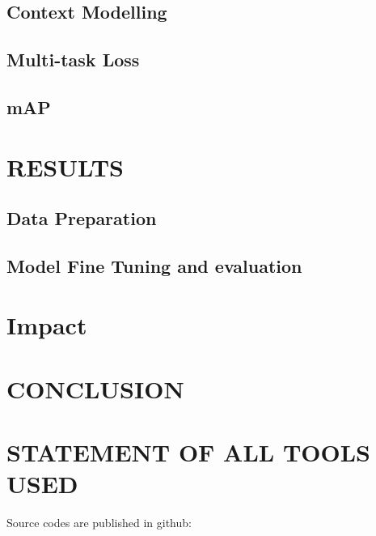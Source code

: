 \documentclass{article}
\begin{document}
\subsection{Context Modelling}

\subsection{Multi-task Loss}



\subsection{mAP}


\section{RESULTS}
\label{sec:results}

\subsection{Data Preparation}
\label{ssec:data}


  \subsection{Model Fine Tuning and evaluation}
  \label{ssec:model}

\section{Impact}
  
\section{CONCLUSION}
\label{sec:conclusion}


\section{STATEMENT OF ALL TOOLS USED}
\label{sec:statementofalltoolsused}


Source codes are published in github: 





\vfill\pagebreak



\end{document}
